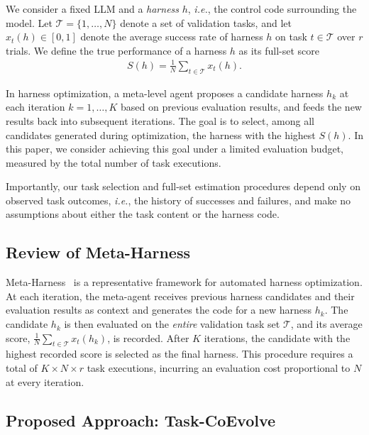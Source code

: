 \documentclass{article} %
\newcommand{\ie}{\textit{i.e.},\xspace}
\begin{document}
We consider a fixed LLM and a \textit{harness} $h$, \ie the control code surrounding the model. Let $\mathcal{T}=\{1,\dots,N\}$ denote a set of validation tasks, and let $x_t(h)\in[0,1]$ denote the average success rate of harness $h$ on task $t\in\mathcal{T}$ over $r$ trials. We define the true performance of a harness $h$ as its full-set score
\begin{equation}
\begin{aligned}
S(h) = \frac{1}{N} \sum_{t \in \mathcal{T}} x_t(h).
\end{aligned}
\label{eq:full_set_score}
\end{equation}

In harness optimization, a meta-level agent proposes a candidate harness $h_k$ at each iteration $k=1,\dots,K$ based on previous evaluation results, and feeds the new results back into subsequent iterations. The goal is to select, among all candidates generated during optimization, the harness with the highest $S(h)$. In this paper, we consider achieving this goal under a limited evaluation budget, measured by the total number of task executions.

Importantly, our task selection and full-set estimation procedures depend only on observed task outcomes, \ie the history of successes and failures, and make no assumptions about either the task content or the harness code.

\subsection{Review of Meta-Harness}
\label{subsec:review_meta_harness}

Meta-Harness~\citep{lee2026meta} is a representative framework for automated harness optimization. At each iteration, the meta-agent receives previous harness candidates and their evaluation results as context and generates the code for a new harness $h_k$. The candidate $h_k$ is then evaluated on the \emph{entire} validation task set $\mathcal{T}$, and its average score, $\frac{1}{N}\sum_{t \in \mathcal{T}} x_t(h_k)$, is recorded. After $K$ iterations, the candidate with the highest recorded score is selected as the final harness. This procedure requires a total of $K \times N \times r$ task executions, incurring an evaluation cost proportional to $N$ at every iteration.
\subsection{Proposed Approach: Task-CoEvolve}
\label{subsec:proposed_approach}
\end{document}

